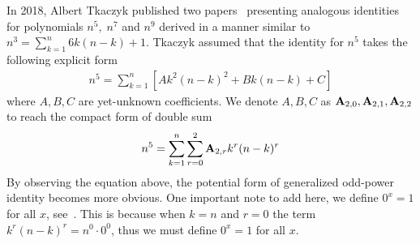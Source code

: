 In 2018, Albert Tkaczyk published two papers~\cite{tkaczyk2018problem, tkaczyk2018continuation}
presenting analogous identities for polynomials $n^5, \; n^7$ and $n^9$
derived in a manner similar to $n^3 = \sum_{k=1}^{n} 6k(n-k) + 1$.
Tkaczyk assumed that the identity for $n^5$ takes the following explicit form
\begin{align*}
    n^5 = \sum_{k=1}^{n} \left[ A k^2(n-k)^2 + Bk(n-k) + C \right]
\end{align*}
where $A,B,C$ are yet-unknown coefficients.
We denote $A,B,C$ as ${\mathbf{A}} \sb{2,0}, {\mathbf{A}} \sb{2,1}, {\mathbf{A}} \sb{2,2}$
to reach the compact form of double sum
\begin{align*}
    n^5 = \sum_{k=1}^{n} \sum_{r=0}^{2} {\mathbf{A}} \sb{2,r} k^r (n-k)^r
\end{align*}
By observing the equation above, the potential form of generalized odd-power identity becomes more obvious.
One important note to add here, we define $0^x = 1$ for all $x$, see~\cite[~p. 162]{graham1994concrete}.
This is because when $k=n$ and $r=0$ the term $k^r (n-k)^r = n^0 \cdot 0^0$, thus we must define $0^x = 1$
for all $x$.

